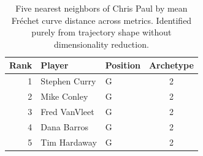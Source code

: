 \begin{table}[htbp]
  \centering\small
  \begin{tabular}{rllc}
    \toprule
    Rank & Player & Position & Archetype \\
    \midrule
    1 & Stephen Curry & G & 2 \\
    2 & Mike Conley & G & 2 \\
    3 & Fred VanVleet & G & 2 \\
    4 & Dana Barros & G & 2 \\
    5 & Tim Hardaway & G & 2 \\
    \bottomrule
  \end{tabular}
  \caption{Five nearest neighbors of Chris Paul by mean Fr\'{e}chet curve distance across metrics. Identified purely from trajectory shape without dimensionality reduction.}
  \label{tab:Chris_Paul_frechet_curve_neighbors}
\end{table}

